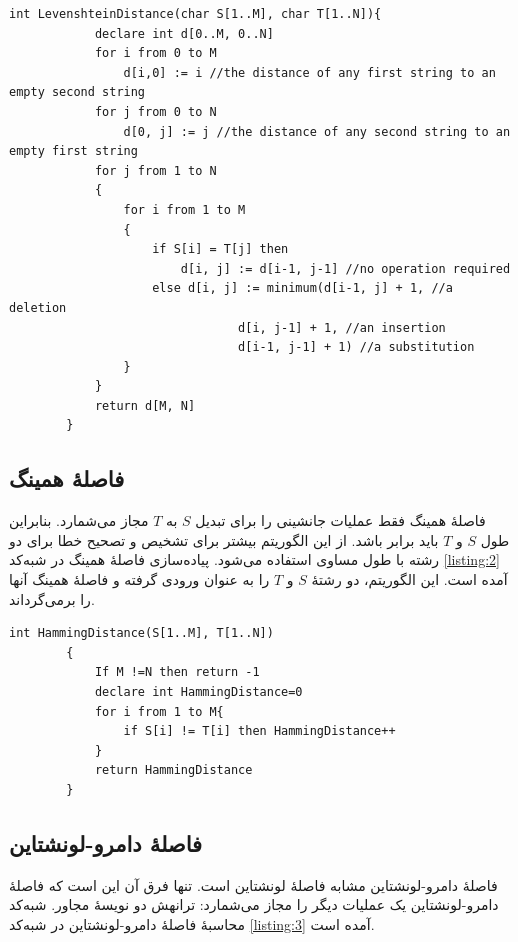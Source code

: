 \documentclass[12pt,onecolumn,a4paper]{article}
\begin{document}
    \begin{LTR}
        \begin{lstlisting}[style=C++Style,caption=\rl{فاصلۀ لونشتاین}, label={listing:1}]
        int LevenshteinDistance(char S[1..M], char T[1..N]){
            declare int d[0..M, 0..N]
            for i from 0 to M
                d[i,0] := i //the distance of any first string to an empty second string
            for j from 0 to N
                d[0, j] := j //the distance of any second string to an empty first string
            for j from 1 to N
            {
                for i from 1 to M
                {
                    if S[i] = T[j] then
                        d[i, j] := d[i-1, j-1] //no operation required
                    else d[i, j] := minimum(d[i-1, j] + 1, //a deletion
                                d[i, j-1] + 1, //an insertion
                                d[i-1, j-1] + 1) //a substitution
                }
            }
            return d[M, N]
        }
        \end{lstlisting}
    \end{LTR}

    \subsection{فاصلۀ همینگ\protect{}}
    فاصلۀ همینگ  فقط عملیات جانشینی را برای تبدیل $S$ به $T$ مجاز می‌شمارد. بنابراین طول $S$ و $T$ باید برابر باشد. از این الگوریتم بیشتر برای تشخیص و تصحیح خطا برای دو رشته با طول مساوی استفاده می‌شود. پیاده‌سازی فاصلۀ همینگ در شبه‌کد \ref{listing:2} آمده است. این الگوریتم، دو رشتۀ $S$ و $T$ را به عنوان ورودی گرفته و فاصلۀ همینگ آنها را برمی‌گرداند.

    \begin{LTR}
        \begin{lstlisting}[style=C++Style,caption=\rl{فاصلۀ همینگ}, label={listing:2}]
        int HammingDistance(S[1..M], T[1..N])
        {
            If M !=N then return -1
            declare int HammingDistance=0
            for i from 1 to M{
                if S[i] != T[i] then HammingDistance++
            }
            return HammingDistance
        }
        \end{lstlisting}
    \end{LTR}

    \subsection{فاصلۀ دامرو-لونشتاین\protect{}}
    فاصلۀ دامرو-لونشتاین  مشابه فاصلۀ لونشتاین است. تنها فرق آن این است که فاصلۀ دامرو-لونشتاین یک عملیات دیگر را مجاز می‌شمارد: ترانهش  دو نویسۀ مجاور. شبه‌کد محاسبۀ فاصلۀ دامرو-لونشتاین در شبه‌کد \ref{listing:3} آمده است.
\end{document}
